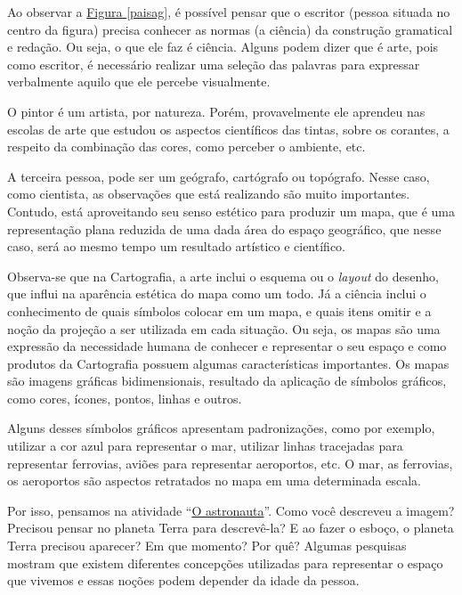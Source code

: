 \label{organizando-carto} 
Ao observar a \hyperref[paisag]{Figura \ref{paisag}},  é possível pensar que o escritor (pessoa situada no centro da figura) precisa conhecer as normas (a ciência) da construção gramatical e redação. Ou seja, o que ele faz é ciência. Alguns podem dizer que é arte, pois como escritor, é necessário realizar uma seleção das palavras para  expressar verbalmente aquilo que ele percebe visualmente.

O pintor é um artista, por natureza. Porém, provavelmente ele aprendeu nas escolas de arte que estudou os aspectos científicos das tintas, sobre os corantes, a respeito da combinação das cores, como perceber o ambiente, etc. 	
	
A terceira pessoa, pode ser um geógrafo, cartógrafo ou topógrafo. Nesse caso, como cientista, as observações que está realizando são muito importantes. Contudo, está aproveitando seu senso estético para produzir um mapa, que é uma representação plana reduzida de uma dada área do espaço geográfico, que nesse caso, será ao mesmo tempo um resultado artístico e científico.

Observa-se que na Cartografia, a arte inclui o esquema ou o \textit{layout} do desenho, que influi na aparência estética do mapa como um todo. Já a ciência inclui o conhecimento de quais símbolos colocar em um mapa, e quais itens omitir e a noção da projeção a ser utilizada em cada situação. Ou seja, os mapas são uma expressão da necessidade humana de conhecer e representar o seu espaço e como produtos da Cartografia possuem algumas características importantes. Os mapas são imagens gráficas bidimensionais, resultado da aplicação de símbolos gráficos, como cores, ícones, pontos, linhas e outros. 

Alguns desses símbolos gráficos apresentam padronizações, como por exemplo, utilizar a cor azul para representar o mar, utilizar linhas tracejadas para representar ferrovias, aviões para representar aeroportos, etc.  O mar, as ferrovias, os aeroportos são aspectos retratados no mapa em uma determinada escala. 

Por isso, pensamos na atividade “\hyperref[astronauta]{O astronauta}”. Como você descreveu a imagem? Precisou pensar no planeta Terra para descrevê-la? E ao fazer o esboço, o planeta Terra precisou aparecer? Em que momento? Por quê?
Algumas pesquisas mostram que existem diferentes concepções utilizadas para representar o espaço que vivemos e essas noções podem depender da idade da pessoa.

